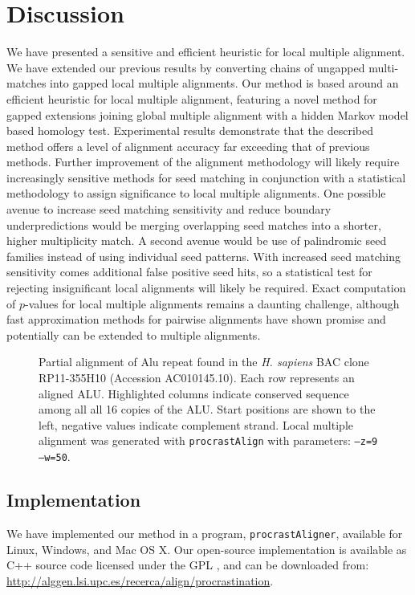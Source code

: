 \documentclass{llncs}
\begin{document}
\section{Discussion}
We have presented a sensitive and efficient heuristic for local
multiple alignment. We have extended our previous results by
converting chains of ungapped multi-matches into gapped local multiple
alignments. Our method is based around an efficient heuristic for
local multiple alignment, featuring a novel method for gapped
extensions joining global multiple alignment with a hidden Markov
model based homology test.  Experimental results demonstrate that the
described method offers a level of alignment accuracy far exceeding
that of previous methods.  Further improvement of the alignment
methodology will likely require increasingly sensitive methods for
seed matching in conjunction with a statistical methodology to assign
significance to local multiple alignments.  One possible avenue to
increase seed matching sensitivity and reduce boundary
underpredictions would be merging overlapping seed matches into a
shorter, higher multiplicity match.  A second avenue would be use of
palindromic seed families instead of using individual seed
patterns. With increased seed matching sensitivity comes additional
false positive seed hits, so a statistical test for rejecting
insignificant local alignments will likely be required.  Exact
computation of $p$-values for local multiple alignments remains a
daunting challenge, although fast approximation methods for pairwise
alignments have shown promise\cite{repseek} and potentially can be
extended to multiple alignments\cite{ref-related1}.
\begin{figure}[t!]
\centering {}
\vspace{-1.0cm}
\caption{Partial alignment of Alu repeat found in the \emph{H. sapiens} BAC
clone RP11-355H10 (Accession AC010145.10). Each row represents an
aligned ALU. Highlighted columns indicate conserved sequence among all
all 16 copies of the ALU. Start positions are shown to the left, negative
values indicate complement strand.  Local multiple alignment was
generated with \texttt{procrastAlign} with parameters: \texttt{--z=9
--w=50}.  }
\label{fig-align}
\end{figure}
\subsection{Implementation}
We have implemented our method in a program, \texttt{procrastAligner},
available for Linux, Windows, and Mac OS X. Our open-source
implementation is available as C++ source code licensed under the GPL , and can be downloaded from: \\
\url{http://alggen.lsi.upc.es/recerca/align/procrastination}.
\end{document}
